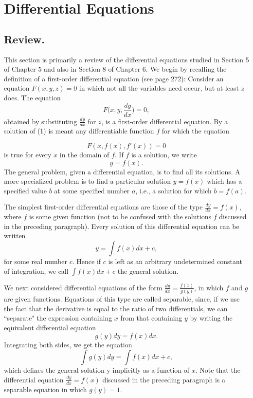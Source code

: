 \chapter{Differential Equations} \label{chp 11}
\section{Review.} This section is primarily a review of the differential equations studied in Section 5 of Chapter 5 and also in Section 8 of Chapter 6. We begin by recalling the definition of a first-order differential equation (see page 272): Consider an equation $F(x, y, z) = 0$ in which not all the variables need occur, but at least $z$ does. The equation
\begin{equation}
F \Big(x, y, \frac{dy}{dx} \Big) = 0 ,
\label{eq11.1.1}
\end{equation}
obtained by substituting $\frac{dy}{dx}$ for $z$, is a first-order differential equation. By a solution of (1) is meant any differentiable function $f$ for which the equation

$$
F(x, f(x), f'(x))= 0
$$
is true for every $x$ in the domain of $f$. If $f$ is a solution, we write
$$
y = f(x).
$$
The general problem, given a differential equation, is to find all its solutions. A more specialized problem is to find a particular solution $y = f(x)$ which has a specified value $b$ at some specified number $a$, i.e., a solution for which $b = f(a)$.

The simplest first-order differential equations are those of the type $\frac{dy}{dx} = f(x)$, where $f$ is some given function (not to be confused with the solutions $f$ discussed in the preceding paragraph). Every solution of this differential equation can be written
$$
y = \int f(x)dx + c,
$$
for some real number $c$. Hence if $c$ is left as an arbitrary undetermined constant of integration, we call $\int f(x) dx + c$ the general solution.

We next considered differential equations of the form $\frac{dy}{dx} = \frac{f(x)}{g(y)}$, in which $f$ and $g$ are given functions. Equations of this type are called 
separable, since, if we use the fact that the derivative is equal to the ratio of two differentials, we can ``separate" the expression containing $x$ from that containing $y$ by writing the equivalent differential equation
$$
g(y) dy = f(x) dx.
$$
Integrating both sides, we get the equation
$$
\int g(y) dy = \int f(x) dx + c, 
$$
which defines the general solution y implicitly as a function of $x$. Note that the differential equation $\frac{dy}{dx} = f(x)$ discussed in the preceding paragraph is a separable equation in which $g(y) = 1$.

